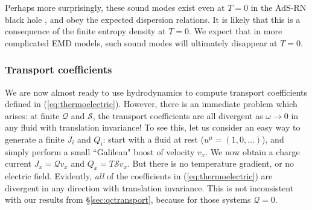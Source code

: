 \documentclass[10pt, oneside]{book}
\begin{document}
\begin{doublespace}
Perhaps more surprisingly, these sound modes exist even at $T=0$ in the AdS-RN black hole \cite{Davison:2013bxa}, and obey the expected dispersion relations.    It is likely that this is a consequence of the finite entropy density at $T=0$.   We expect that in more complicated EMD models, such sound modes will ultimately disappear at $T=0$.




\subsubsection{Transport coefficients}
We are now almost ready to use hydrodynamics to compute transport coefficients defined in (\ref{eq:thermoelectric}).   However, there is an immediate problem which arises:  at finite $\mathcal{Q}$ and $\mathcal{S}$, the transport coefficients are all divergent as $\omega\rightarrow 0$ in any fluid with translation invariance!   To see this, let us consider an easy way to generate a finite $J_i$ and $Q_i$:  start with a fluid at rest ($u^\mu = (1,0,\ldots)$), and simply perform a small ``Galilean" boost of velocity $v_x$.   We now obtain a charge current $J_x = \mathcal{Q}v_x$ and $Q_x = T\mathcal{S}v_x$.   But there is no temperature gradient, or no electric field.    Evidently, \emph{all} of the coefficients in (\ref{eq:thermoelectric}) are divergent in any direction with translation invariance.  This is not inconsistent with our results from \S\ref{sec:qctransport}, because for those systems $\mathcal{Q}=0$.   


\end{doublespace}
\end{document}

